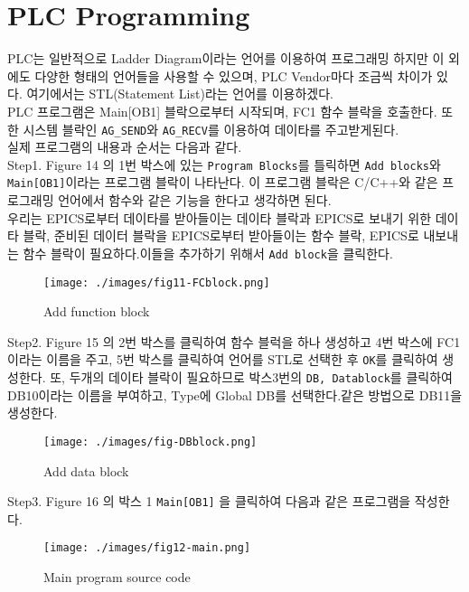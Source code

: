 \documentclass[11pt
  , a4paper
  , article
  , oneside
]{memoir}
\begin{document}
\section{PLC Programming}
PLC는 일반적으로 Ladder Diagram이라는 언어를 이용하여 프로그래밍 하지만 이 외에도 다양한 형태의 언어들을 사용할 수 있으며, PLC Vendor마다 조금씩 차이가 있다. 여기에서는 STL(Statement List)라는 언어를 이용하겠다. \\
\newline  PLC 프로그램은 Main[OB1] 블락으로부터 시작되며, FC1 함수 블락을 호출한다. 또한 시스템 블락인 \verb|AG_SEND|와 \verb|AG_RECV|를 이용하여 데이타를 주고받게된다.\\
 실제 프로그램의 내용과 순서는 다음과 같다.\\
\newline Step1. Figure 14 의 1번 박스에 있는 \verb|Program Blocks|를 틀릭하면 \verb|Add blocks|와 \verb|Main[OB1]|이라는 프로그램 블락이 나타난다. 이 프로그램 블락은 C/C++와 같은 프로그래밍 언어에서 함수와 같은 기능을 한다고 생각하면 된다.\\
\newline  우리는 EPICS로부터 데이타를 받아들이는 데이타 블락과 EPICS로 보내기 위한 데이타 블락, 준비된 데이터 블락을 EPICS로부터 받아들이는 함수 블락, EPICS로 내보내는 함수 블락이 필요하다.이들을 추가하기 위해서 \verb|Add block|을 클릭한다.\\
\begin{figure}[!htb]
  \centering
  \texttt{[image: ./images/fig11-FCblock.png]}
  \caption{Add function block}
  \label{}
\end{figure}
\newline Step2. Figure 15 의 2번 박스를 클릭하여 함수 블럭을 하나 생성하고 4번 박스에 FC1이라는 이름을 주고, 5번 박스를 클릭하여 언어를 STL로 선택한 후 \verb|OK|를 클릭하여 생성한다. 
\newline 또, 두개의 데이타 블락이 필요하므로 박스3번의 \verb|DB, Datablock|를 클릭하여 DB10이라는 이름을 부여하고, Type에 Global DB를 선택한다.같은 방법으로 DB11을 생성한다.\\
\begin{figure}[!htb]
  \centering
  \texttt{[image: ./images/fig-DBblock.png]}
  \caption{Add data block}
  \label{}
\end{figure}
\newline Step3. Figure 16 의 박스 1 \verb|Main[OB1]| 을 클릭하여 다음과 같은 프로그램을 작성한다.\\
\begin{figure}[!htb]
  \centering
  \texttt{[image: ./images/fig12-main.png]}
  \caption{Main program source code}
  \label{}
\end{figure}
\end{document}
